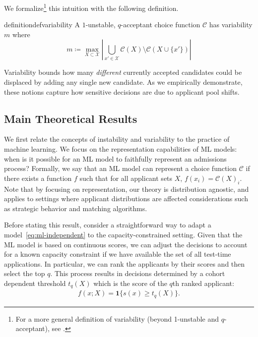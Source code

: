 \documentclass[letterpaper]{article}
\newcommand{\calX}{\mathcal{X}}
\newcommand{\choice}{\mathcal{C}}
\begin{document}
We formalize\footnote{For a more general definition of variability (beyond 1-unstable and $q$-acceptant), see .} this intuition with the following definition.

\begin{restatable}[Variability]{definition}{defvariability}
\label{def:variability}
A $1$-unstable, $q$-acceptant choice function $\choice$ has variability $m$ where
\begin{equation}
m \coloneqq \max_{X\subset \calX} \left|\bigcup\limits_{x'\in\calX} \choice(X) \setminus \choice(X \cup \{x'\})\right|
\end{equation}
\end{restatable}
\noindent Variability bounds how many \textit{different} currently accepted candidates could be displaced by adding any single new candidate. As we empirically demonstrate, these notions capture how sensitive decisions are due to applicant pool shifts.

\subsection{Main Theoretical Results} \label{sec:theory-results}

We first relate the concepts of instability and variability to the practice of machine learning.
We focus on the representation capabilities of ML models: when is it possible for an ML model to faithfully represent an admissions process?
Formally, we say that an ML model can represent a choice function $\mathcal C$ if there exists a function $f$ such that for all applicant sets $X$, $f(x_i) = \mathcal C(X)_i$.
{Note that by focusing on representation, our theory is distribution agnostic, and applies to settings where applicant distributions are affected considerations such as strategic behavior and matching algorithms.}

Before stating this result, consider a straightforward way to adapt a model~\eqref{eq:ml-independent} to the capacity-constrained setting.
Given that the ML model is based on continuous scores, we can adjust the decisions to account for a known capacity constraint if we have available the set of all test-time applications.
In particular, we can rank the applicants by their scores and then select the top $q$.
This process results in decisions determined by a cohort dependent threshold $t_q(X)$ which is the score of the $q$th ranked applicant:
\begin{align}\label{eq:ml-rank}
    f(x; X) = \mathbf 1\{s(x) \geq t_q(X)\}.
\end{align}
\end{document}
